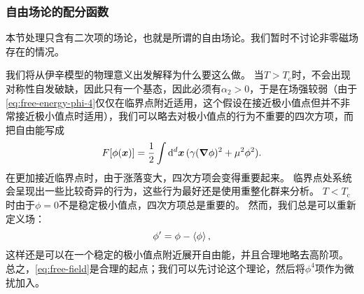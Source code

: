 \documentclass[hyperref, UTF8, a4paper]{ctexart}
\begin{document}
\subsubsection{自由场论的配分函数}\label{sec:free-field-theory-partition-function}

本节处理只含有二次项的场论，也就是所谓的自由场论。我们暂时不讨论非零磁场存在的情况。

我们将从伊辛模型的物理意义出发解释为什么要这么做。
当$T>T_\text{c}$时，不会出现对称性自发破缺，因此只有一个基态，因此必须有$\alpha_2 > 0$，于是在场强较弱（由于\eqref{eq:free-energy-phi-4}仅仅在临界点附近适用，这个假设在接近极小值点但并不非常接近极小值点时适用），我们可以略去对极小值点的行为不重要的四次方项，而把自由能写成
\begin{equation}
    F[\phi(\vb*{x})] = \frac{1}{2} \int \dd[d]{\vb*{x}} (\gamma (\grad{\phi})^2 + \mu^2 \phi^2).
    \label{eq:free-field}
\end{equation}
在更加接近临界点时，由于涨落变大，四次方项会变得重要起来。
临界点处系统会呈现出一些比较奇异的行为，这些行为最好还是使用重整化群来分析。
$T<T_\text{c}$时由于$\phi=0$不是稳定极小值点，四次方项总是重要的。
然而，我们总是可以重新定义场：
\[
    \phi' = \phi - \expval{\phi},
\]
这样还是可以在一个稳定的极小值点附近展开自由能，并且合理地略去高阶项。
总之，\eqref{eq:free-field}是合理的起点；我们可以先讨论这个理论，然后将$\phi^4$项作为微扰加入。
\end{document}
